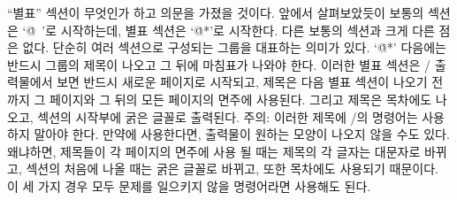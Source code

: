 ``별표'' 섹션이 무엇인가 하고 의문을 가졌을 것이다. 앞에서 살펴보았듯이 보통의 섹션은
`\.{@\ }'로 시작하는데, 별표 섹션은 `\.{@*}'로 시작한다. 다른 보통의 섹션과 크게 다른 점은
없다. 단순히 여러 섹션으로 구성되는 그룹을 대표하는 의미가 있다. `\.{@*}' 다음에는 반드시
그룹의 제목이 나오고 그 뒤에 마침표가 나와야 한다. 이러한 별표 섹션은 \TEX/ 출력물에서 보면
반드시 새로운 페이지로 시작되고, 제목은 다음 별표 섹션이 나오기 전까지 그 페이지와 그 뒤의
모든 페이지의 면주에 사용된다. 그리고 제목은 목차에도 나오고, 섹션의 시작부에 굵은 글꼴로
출력된다.
주의: 이러한 제목에 \TEX/의 명령어는 사용하지 말아야 한다. 만약에 사용한다면, 출력물이 
원하는 모양이 나오지 않을 수도 있다. 왜냐하면, 제목들이 각 페이지의 면주에 사용 될 때는
제목의 각 글자는 대문자로 바뀌고, 섹션의 처음에 나올 때는 굵은 글꼴로 바뀌고, 또한 목차에도
사용되기 때문이다. 이 세 가지 경우 모두 문제를 일으키지 않을 명령어라면 사용해도 된다.

